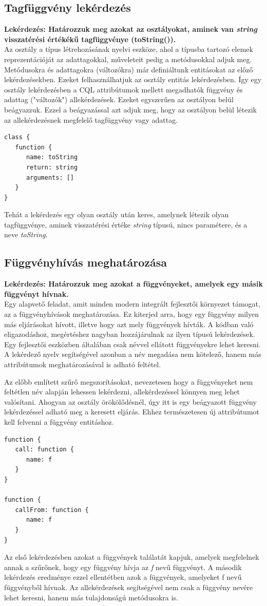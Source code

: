 \documentclass[a4paper,12pt]{report}
\begin{document}
\subsection{Tagfüggvény lekérdezés}
\textbf{Lekérdezés: Határozzuk meg azokat az osztályokat, aminek van \textit{string} visszatérési értékékű tagfüggvénye (toString()).}
\\
Az osztály a típus létrehozásának nyelvi eszköze, ahol a típusba tartozó elemek reprezentációját az adattagokkal, műveleteit pedig a metódusokkal adjuk meg. Metódusokra és adattagokra (változókra) már definiáltunk entitásokat az előző lekérdezésekben. Ezeket felhasználhatjuk az osztály entitás lekérdezésben. Így egy osztály lekérdezésben a CQL attribútumok mellett megadhatók függvény és adattag ("változók") allekérdezések. Ezeket egyszerűen az osztályon belül beágyazzuk. Ezzel a beágyazással azt adjuk meg, hogy az osztályon belül létezik az allekérdezésnek megfelelő tagfüggvény vagy adattag.
\begin{verbatim}
class {
   function {
      name: toString
      return: string
      arguments: []
   }
}
\end{verbatim}
Tehát a lekérdezés egy olyan osztály után keres, amelynek létezik olyan tagfüggvénye, aminek visszatérési értéke \textit{string} típusú, nincs paramétere, és a neve \textit{toString}.
\subsection{Függvényhívás meghatározása}
\textbf{Lekérdezés: Határozzuk meg azokat a függvényeket, amelyek egy másik függvényt hívnak.}
\\
Egy alapvető feladat, amit minden modern integrált fejlesztői környezet támogat, az a függvényhívások meghatározása. Ez kiterjed arra, hogy egy függvény milyen más eljárásokat hívott, illetve hogy azt mely függvények hívták. A kódban való eligazodáshoz, megértéshez nagyban hozzájárulnak az ilyen típusú lekérdezések. Egy fejlesztői eszközben általában csak névvel ellátott függvényekre lehet keresni. A lekérdező nyelv segítségével azonban a név megadása nem kötelező, hanem más attribútumok meghatározásával is adható feltétel.
\par  Az előbb említett szűrő megszorításokat, nevezetesen hogy a függvényeket nem feltétlen név alapján lehessen lekérdezni, allekérdezéssel könnyen meg lehet valósítani. Ahogyan az osztály örökölődésnél, úgy itt is egy beágyazott függvény lekérdezéssel adható meg a keresett eljárás. Ehhez természetesen új attribútumot kell felvenni a függvény entitáshoz.
\begin{verbatim}
function {
   call: function { 
      name: f 
   }
}

function {
   callFrom: function { 
      name: f 
   }
}
\end{verbatim}
\par Az első lekérdezésben azokat a függvények találatát kapjuk, amelyek megfelelnek annak a szűrőnek, hogy egy függvény hívja az \textit{f} nevű függvényt. A második lekérdezés eredménye ezzel ellentétben azok a függvények, amelyeket f nevű függvényből hívnak. Az allekérdezések segítségével nem csak a függvény nevére lehet keresni, hanem más tulajdonságú metódusokra is.
\end{document}

